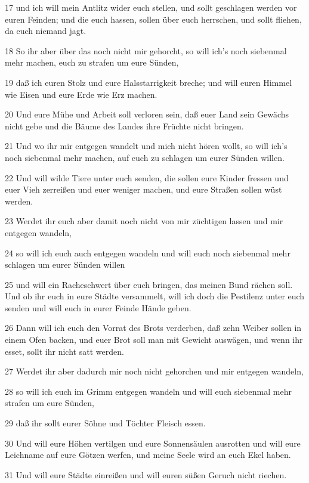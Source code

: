 \par 17 und ich will mein Antlitz wider euch stellen, und sollt geschlagen werden vor euren Feinden; und die euch hassen, sollen über euch herrschen, und sollt fliehen, da euch niemand jagt.
\par 18 So ihr aber über das noch nicht mir gehorcht, so will ich's noch siebenmal mehr machen, euch zu strafen um eure Sünden,
\par 19 daß ich euren Stolz und eure Halsstarrigkeit breche; und will euren Himmel wie Eisen und eure Erde wie Erz machen.
\par 20 Und eure Mühe und Arbeit soll verloren sein, daß euer Land sein Gewächs nicht gebe und die Bäume des Landes ihre Früchte nicht bringen.
\par 21 Und wo ihr mir entgegen wandelt und mich nicht hören wollt, so will ich's noch siebenmal mehr machen, auf euch zu schlagen um eurer Sünden willen.
\par 22 Und will wilde Tiere unter euch senden, die sollen eure Kinder fressen und euer Vieh zerreißen und euer weniger machen, und eure Straßen sollen wüst werden.
\par 23 Werdet ihr euch aber damit noch nicht von mir züchtigen lassen und mir entgegen wandeln,
\par 24 so will ich euch auch entgegen wandeln und will euch noch siebenmal mehr schlagen um eurer Sünden willen
\par 25 und will ein Racheschwert über euch bringen, das meinen Bund rächen soll. Und ob ihr euch in eure Städte versammelt, will ich doch die Pestilenz unter euch senden und will euch in eurer Feinde Hände geben.
\par 26 Dann will ich euch den Vorrat des Brots verderben, daß zehn Weiber sollen in einem Ofen backen, und euer Brot soll man mit Gewicht auswägen, und wenn ihr esset, sollt ihr nicht satt werden.
\par 27 Werdet ihr aber dadurch mir noch nicht gehorchen und mir entgegen wandeln,
\par 28 so will ich euch im Grimm entgegen wandeln und will euch siebenmal mehr strafen um eure Sünden,
\par 29 daß ihr sollt eurer Söhne und Töchter Fleisch essen.
\par 30 Und will eure Höhen vertilgen und eure Sonnensäulen ausrotten und will eure Leichname auf eure Götzen werfen, und meine Seele wird an euch Ekel haben.
\par 31 Und will eure Städte einreißen und will euren süßen Geruch nicht riechen.
